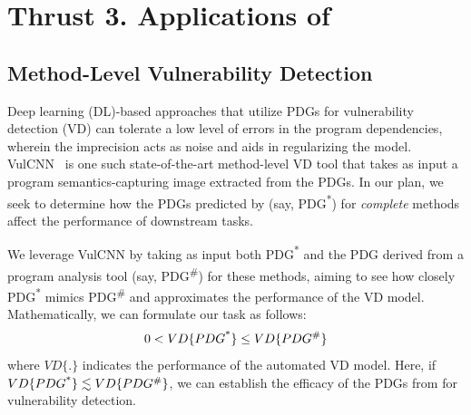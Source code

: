 \section{Thrust 3. Applications of {\tool}}
\label{sec:thrust3}


\subsection{Method-Level Vulnerability Detection}


Deep learning (DL)-based approaches that utilize PDGs for
vulnerability detection (VD) can tolerate a low level of errors in the
program dependencies, wherein the imprecision acts as noise and aids
in regularizing the model. VulCNN~\cite{wu2022vulcnn} is one such
state-of-the-art method-level VD tool that takes as input a program
semantics-capturing image extracted from the PDGs. In our plan,
we seek to determine how the PDGs predicted by \tool (say,
PDG\textsuperscript{*}) for {\em complete} methods affect the
performance of downstream tasks.


We leverage VulCNN by taking as input both PDG\textsuperscript{*} and
the PDG derived from a program analysis tool (say,
PDG\textsuperscript{\#}) for these methods, aiming to see how closely
PDG\textsuperscript{*} mimics PDG\textsuperscript{\#} and approximates
the performance of the VD model. Mathematically, we can formulate our
task as follows:
\begin{equation}
    \centering
    0 < VD\{PDG\textsuperscript{*}\} \leq VD\{PDG\textsuperscript{\#}\}
\end{equation}
where $VD\{.\}$ indicates the performance of the automated VD model. Here, if $VD\{PDG\textsuperscript{*}\} \lesssim VD\{PDG\textsuperscript{\#}\}$, we can establish the efficacy of the PDGs from \tool for vulnerability detection.




